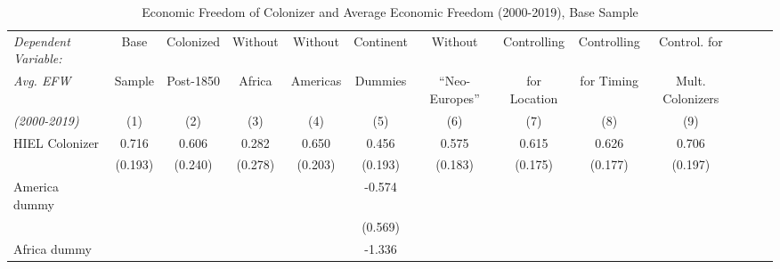 \begin{sidewaystable}[h!]
\begin{threeparttable}
\begin{center}
\begin{minipage}{\textwidth}
\small
\caption{Economic Freedom of Colonizer and Average Economic Freedom (2000-2019), Base Sample}
\label{tab:Tab3}
\begin{tabular*}{\textwidth}{@{\extracolsep{\fill}}lcccccccccccc@{\extracolsep{\fill}}}
\hline\hline
            \textit{Dependent Variable:}&\multicolumn{1}{c}{Base}&\multicolumn{1}{c}{Colonized}&\multicolumn{1}{c}{Without}&\multicolumn{1}{c}{Without}&\multicolumn{1}{c}{Continent}&\multicolumn{1}{c}{Without}&\multicolumn{1}{c}{Controlling}&\multicolumn{1}{c}{Controlling}&\multicolumn{1}{c}{Control. for}\\
            \textit{Avg. EFW}&\multicolumn{1}{c}{Sample}&\multicolumn{1}{c}{Post-1850}&\multicolumn{1}{c}{Africa}&\multicolumn{1}{c}{Americas}&\multicolumn{1}{c}{Dummies}&\multicolumn{1}{c}{``Neo-Europes''}&\multicolumn{1}{c}{for Location}&\multicolumn{1}{c}{for Timing}&\multicolumn{1}{c}{Mult. Colonizers}\\
            \textit{(2000-2019)}&\multicolumn{1}{c}{(1)}&\multicolumn{1}{c}{(2)}&\multicolumn{1}{c}{(3)}&\multicolumn{1}{c}{(4)}&\multicolumn{1}{c}{(5)}&\multicolumn{1}{c}{(6)}&\multicolumn{1}{c}{(7)}&\multicolumn{1}{c}{(8)}&\multicolumn{1}{c}{(9)}\\
\hline
HIEL Colonizer &       0.716\sym{***}&       0.606\sym{**} &       0.282         &       0.650\sym{***}&       0.456\sym{**} &       0.575\sym{***}&       0.615\sym{***}&       0.626\sym{***}&       0.706\sym{***}\\
            &     (0.193)         &     (0.240)         &     (0.278)         &     (0.203)         &     (0.193)         &     (0.183)         &     (0.175)         &      (0.177)         &     (0.197)         \\
[0.125em]
America dummy     &                     &                     &                     &                     &      -0.574         &                     &                     &                     &                     \\
            &                     &                     &                     &                     &     (0.569)         &                     &                     &                     &                     \\
[0.125em]
Africa dummy      &                     &                     &                     &                     &      -1.336\sym{***}&                     &                     &                     &                     \\

\end{tabular*}
\end{minipage}
\end{center}
\end{threeparttable}
\end{sidewaystable}

